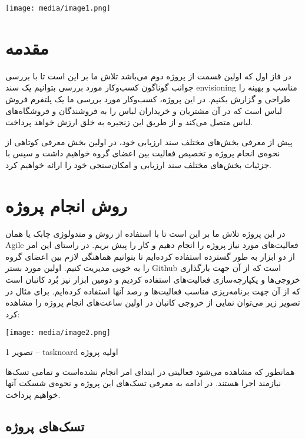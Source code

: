 \documentclass[]{article}
\date{}
\begin{document}
\texttt{[image: media/image1.png]}

\section{مقدمه}\label{ux645ux642ux62fux645ux647}

در فاز اول که اولین قسمت از پروژه دوم می‌باشد تلاش ما بر این است تا با
بررسی جوانب گوناگون کسب‌وکار مورد بررسی بتوانیم یک سند envisioning مناسب
و بهینه را طراحی و گزارش بکنیم. در این پروژه، کسب‌وکار مورد بررسی ما یک
پلتفرم فروش لباس است که در آن مشتریان و خریداران لباس را به فروشندگان و
فروشگاه‌های لباس متصل می‌کند و از طریق این زنجیره به خلق ارزش خواهد
پرداخت.

پیش از معرفی بخش‌های مختلف سند ارزیابی خود، در اولین بخش معرفی کوتاهی از
نحوه‌ی انجام پروژه و تخصیص فعالیت بین اعضای گروه خواهیم داشت و سپس با
جزئیات بخش‌های مختلف سند ارزیابی و امکان‌سنجی خود را ارائه خواهیم کرد.

\section{روش انجام
پروژه}\label{ux631ux648ux634-ux627ux646ux62cux627ux645-ux67eux631ux648ux698ux647}

در این پروژه تلاش ما بر این است تا با استفاده از روش و متدولوژی چابک یا
همان Agile فعالیت‌های مورد نیاز پروژه را انجام دهیم و کار را پیش بریم.
در راستای این امر از دو ابزار به طور گسترده استفاده کرده‌ایم تا بتوانیم
هماهنگی لازم بین اعضای گروه را به خوبی مدیریت کنیم. اولین مورد بستر
Github است که از آن جهت بارگذاری خروجی‌ها و یکپارچه‌سازی فعالیت‌های
استفاده کردیم و دومین ابزار نیز بٌرد کانبان است که از آن جهت برنامه‌ریزی
مناسب فعالیت‌ها و رصد آنها استفاده کرده‌ایم. برای مثال در تصویر زیر
می‌توان نمایی از خروجی کانبان در اولین ساعت‌های انجام پروژه را مشاهده
کرد:

\texttt{[image: media/image2.png]}

تصویر 1 -- tasknoard اولیه پروژه

همانطور که مشاهده می‌شود فعالیتی در ابتدای امر انجام نشده‌است و تمامی
تسک‌ها نیازمند اجرا هستند. در ادامه به معرفی تسک‌های این پروژه و نحوه‌ی
شسکت‌ آنها خواهیم پرداخت.

\subsection{تسک‌های
پروژه}\label{ux62aux633ux6a9ux647ux627ux6cc-ux67eux631ux648ux698ux647}
\end{document}
